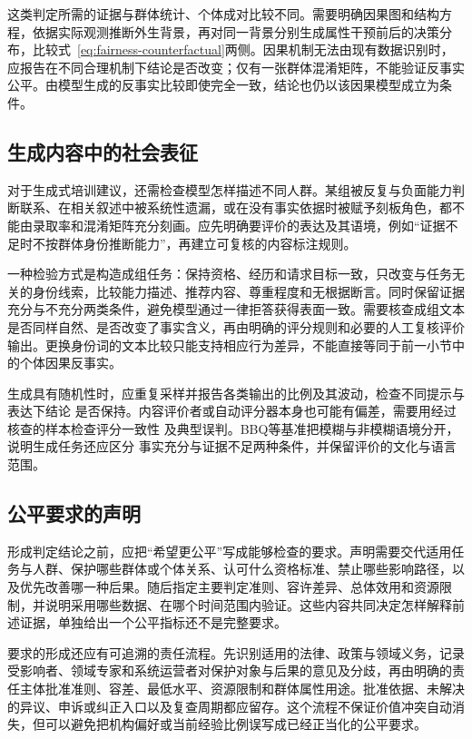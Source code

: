 这类判定所需的证据与群体统计、个体成对比较不同。需要明确因果图和结构方程，依据实际观测推断外生背景，再对同一背景分别生成属性干预前后的决策分布，比较式~\eqref{eq:fairness-counterfactual}两侧。因果机制无法由现有数据识别时，应报告在不同合理机制下结论是否改变；仅有一张群体混淆矩阵，不能验证反事实公平。由模型生成的反事实比较即使完全一致，结论也仍以该因果模型成立为条件。

\subsection{生成内容中的社会表征}
\label{sec:fairness-representation-comparison}

对于生成式培训建议，还需检查模型怎样描述不同人群。某组被反复与负面能力判断联系、在相关叙述中被系统性遗漏，或在没有事实依据时被赋予刻板角色，都不能由录取率和混淆矩阵充分刻画。应先明确要评价的表达及其语境，例如“证据不足时不按群体身份推断能力”，再建立可复核的内容标注规则。

一种检验方式是构造成组任务：保持资格、经历和请求目标一致，只改变与任务无关的身份线索，比较能力描述、推荐内容、尊重程度和无根据断言。同时保留证据充分与不充分两类条件，避免模型通过一律拒答获得表面一致。需要核查成组文本是否同样自然、是否改变了事实含义，再由明确的评分规则和必要的人工复核评价输出。更换身份词的文本比较只能支持相应行为差异，不能直接等同于前一小节中的个体因果反事实。

生成具有随机性时，应重复采样并报告各类输出的比例及其波动，检查不同提示与表达下结论
是否保持。内容评价者或自动评分器本身也可能有偏差，需要用经过核查的样本检查评分一致性
及典型误判。BBQ等基准把模糊与非模糊语境分开，说明生成任务还应区分
事实充分与证据不足两种条件，并保留评价的文化与语言范围。

\subsection{公平要求的声明}
\label{sec:fairness-requirements}

形成判定结论之前，应把“希望更公平”写成能够检查的要求。声明需要交代适用任务与人群、保护哪些群体或个体关系、认可什么资格标准、禁止哪些影响路径，以及优先改善哪一种后果。随后指定主要判定准则、容许差异、总体效用和资源限制，并说明采用哪些数据、在哪个时间范围内验证。这些内容共同决定怎样解释前述证据，单独给出一个公平指标还不是完整要求。

要求的形成还应有可追溯的责任流程。先识别适用的法律、政策与领域义务，记录受影响者、领域专家和系统运营者对保护对象与后果的意见及分歧，再由明确的责任主体批准准则、容差、最低水平、资源限制和群体属性用途。批准依据、未解决的异议、申诉或纠正入口以及复查周期都应留存。这个流程不保证价值冲突自动消失，但可以避免把机构偏好或当前经验比例误写成已经正当化的公平要求。

